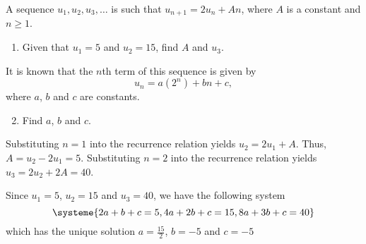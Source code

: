 \begin{problem}
    A sequence $u_1, u_2, u_3, \ldots$ is such that $u_{n+1} = 2u_n + An$, where $A$ is a constant and $n \geq 1$.

    \begin{enumerate}
        \item Given that $u_1 = 5$ and $u_2 = 15$, find $A$ and $u_3$.
    \end{enumerate}

    It is known that the $n$th term of this sequence is given by \[u_n = a(2^n) + bn +c,\] where $a$, $b$ and $c$ are constants.

    \begin{enumerate}
        \setcounter{enumi}{1}
        \item Find $a$, $b$ and $c$.
    \end{enumerate}
\end{problem}
\begin{solution}
    \begin{ppart}
        Substituting $n = 1$ into the recurrence relation yields $u_2 = 2u_1 + A$. Thus, $A = u_2 - 2u_1 = 5$. Substituting $n = 2$ into the recurrence relation yields $u_3 = 2u_2 + 2A = 40$.
    \end{ppart}
    \begin{ppart}
        Since $u_1=5$, $u_2 = 15$ and $u_3 = 40$, we have the following system \[\systeme{2a + b + c = 5,4a + 2b + c = 15,8a + 3b + c = 40}\] which has the unique solution $a = \frac{15}2$, $b=-5$ and $c=-5$
    \end{ppart}
\end{solution}

